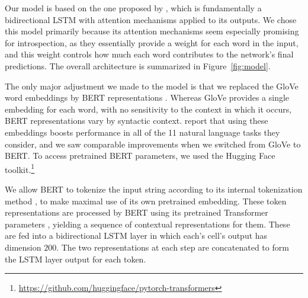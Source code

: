 \documentclass[11pt,a4paper]{article}
\begin{document}
Our model is based on the one proposed by \citeauthor{Lin:2017}, which is fundamentally a  bidirectional LSTM with attention mechanisms applied to its outputs. We chose this model primarily because its attention mechanisms seem especially promising for introspection, as they essentially provide a weight for each word in the input, and this weight controls how much each word contributes to the network's final predictions. The overall architecture is summarized in Figure~\ref{fig:model}.



The only major adjustment we made to the model is that we replaced the GloVe word embeddings \citep{Pennington:2014} by BERT representations \citep{Devlin:2018}. Whereas GloVe provides a single embedding for each word, with no sensitivity to the context in which it occurs, BERT representations vary by syntactic context. \citeauthor{Devlin:2018} report that using these embeddings boosts performance in all of the 11 natural language tasks they consider, and we saw comparable improvements when we switched from GloVe to BERT. To access pretrained BERT parameters, we used the Hugging Face toolkit.\footnote{\url{https://github.com/huggingface/pytorch-transformers}}

We allow BERT to tokenize the input string according to its internal tokenization method \citep{wu2016google}, to make maximal use of its own pretrained embedding. These token representations are processed by BERT using its pretrained Transformer parameters \citep{Vaswani:2017}, yielding a sequence of contextual representations for them. These are fed into a bidirectional LSTM layer in which each's cell's output has dimension $200$. The two representations at each step are concatenated to form the LSTM layer output for each token.
\end{document}
